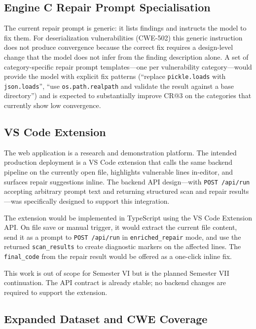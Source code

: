\documentclass[12pt,a4paper]{report}
\begin{document}
\subsection{Engine C Repair Prompt Specialisation}
\label{ssec:fw_enginec}

The current repair prompt is generic: it lists findings and instructs the model
to fix them. For deserialization vulnerabilities (CWE-502) this generic
instruction does not produce convergence because the correct fix requires a
design-level change that the model does not infer from the finding description
alone. A set of category-specific repair prompt templates---one per
vulnerability category---would provide the model with explicit fix patterns
(``replace \texttt{pickle.loads} with \texttt{json.loads}'', ``use
\texttt{os.path.realpath} and validate the result against a base directory'')
and is expected to substantially improve CR@3 on the categories that currently
show low convergence.

\subsection{VS Code Extension}
\label{ssec:fw_vscode}

The web application is a research and demonstration platform. The intended
production deployment is a VS Code extension that calls the same backend
pipeline on the currently open file, highlights vulnerable lines in-editor,
and surfaces repair suggestions inline. The backend API design---with
\texttt{POST /api/run} accepting arbitrary prompt text and returning structured
scan and repair results---was specifically designed to support this integration.

The extension would be implemented in TypeScript using the VS Code Extension
API. On file save or manual trigger, it would extract the current file content,
send it as a prompt to \texttt{POST /api/run} in \texttt{enriched\_repair} mode,
and use the returned \texttt{scan\_results} to create diagnostic markers on the
affected lines. The \texttt{final\_code} from the repair result would be offered
as a one-click inline fix.

This work is out of scope for Semester VI but is the planned Semester VII
continuation. The API contract is already stable; no backend changes are required
to support the extension.

\subsection{Expanded Dataset and CWE Coverage}
\label{ssec:fw_dataset}
\end{document}
